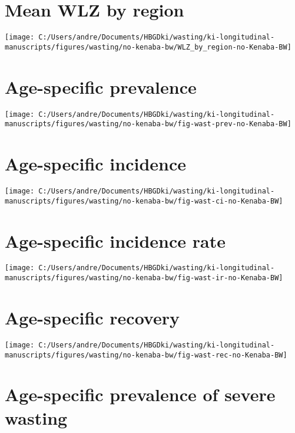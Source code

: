\documentclass[
  9pt,
]{book}
\begin{document}
\hypertarget{mean-wlz-by-region}{%
\section{Mean WLZ by region}\label{mean-wlz-by-region}}

\texttt{[image: C:/Users/andre/Documents/HBGDki/wasting/ki-longitudinal-manuscripts/figures/wasting/no-kenaba-bw/WLZ\_by\_region-no-Kenaba-BW]}

\hypertarget{age-specific-prevalence-2}{%
\section{Age-specific prevalence}\label{age-specific-prevalence-2}}

\texttt{[image: C:/Users/andre/Documents/HBGDki/wasting/ki-longitudinal-manuscripts/figures/wasting/no-kenaba-bw/fig-wast-prev-no-Kenaba-BW]}

\hypertarget{age-specific-incidence-1}{%
\section{Age-specific incidence}\label{age-specific-incidence-1}}

\texttt{[image: C:/Users/andre/Documents/HBGDki/wasting/ki-longitudinal-manuscripts/figures/wasting/no-kenaba-bw/fig-wast-ci-no-Kenaba-BW]}

\hypertarget{age-specific-incidence-rate-1}{%
\section{Age-specific incidence rate}\label{age-specific-incidence-rate-1}}

\texttt{[image: C:/Users/andre/Documents/HBGDki/wasting/ki-longitudinal-manuscripts/figures/wasting/no-kenaba-bw/fig-wast-ir-no-Kenaba-BW]}

\hypertarget{age-specific-recovery-1}{%
\section{Age-specific recovery}\label{age-specific-recovery-1}}

\texttt{[image: C:/Users/andre/Documents/HBGDki/wasting/ki-longitudinal-manuscripts/figures/wasting/no-kenaba-bw/fig-wast-rec-no-Kenaba-BW]}

\hypertarget{age-specific-prevalence-of-severe-wasting-2}{%
\section{Age-specific prevalence of severe wasting}\label{age-specific-prevalence-of-severe-wasting-2}}
\end{document}
